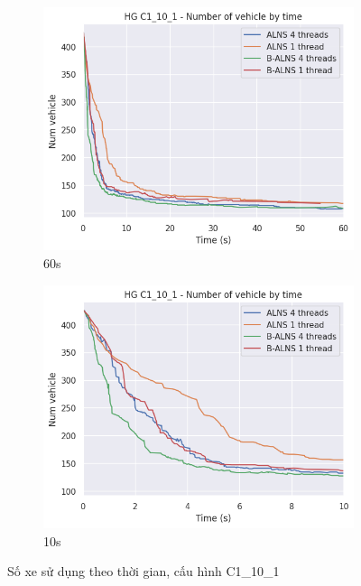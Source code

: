 \begin{figure}[H] %
  \label{fig:perf_ct_c1_10}
  \begin{subfigure}{.5\textwidth}
    \centering
    \includegraphics[width=0.9\linewidth]{figures/nv_time_60s_C1_10_1.png}
    \caption{60s}
    \label{fig:perf_ct_c1_10_60s}
  \end{subfigure}%
  \begin{subfigure}{.5\textwidth}
    \centering
    \includegraphics[width=0.9\linewidth]{figures/nv_time_10s_C1_10_1.png}
    \caption{10s}
    \label{fig:perf_ct_c1_10_10s}
  \end{subfigure}
  \caption{Số xe sử dụng theo thời gian, cấu hình C1\_10\_1}
\end{figure}

